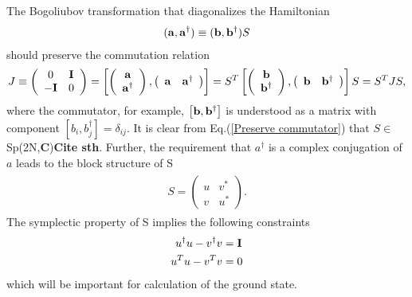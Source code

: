 The Bogoliubov transformation that diagonalizes the Hamiltonian
\begin{eqnarray}\begin{aligned}
\label{Def. of a}
({\bf a} , {\bf a}^\dagger)\equiv({\bf b} , {\bf b}^\dagger)S
\end{aligned}\end{eqnarray}
should preserve the commutation relation
\begin{eqnarray}\begin{aligned}
\label{Preserve commutator}
J\equiv\left(\begin{array}{ccc}
0 & {\bf I}\\
-{\bf I} & 0
\end{array}\right)
=\left[
\left(\begin{array}{ccc}
{\bf a} \\
{\bf a}^\dagger
\end{array}\right),
\left(\begin{array}{ccc}
{\bf a} & {\bf a}^\dagger
\end{array}\right)\right]
=S^T\left[
\left(\begin{array}{ccc}
{\bf b} \\
{\bf b}^\dagger
\end{array}\right),
\left(\begin{array}{ccc}
{\bf b} & {\bf b}^\dagger
\end{array}\right)\right]S
=S^T JS,
\end{aligned}\end{eqnarray}
where the commutator, for example, $\left[{\bf b},{\bf b}^\dagger\right]$ is understood as a matrix with component $\left[b_i,b_j^\dagger\right]=\delta_{ij}$. It is clear from Eq.(\ref{Preserve commutator}) that $S\in$Sp(2N,{\bf C}){\bf\color{red}Cite sth}. Further, the requirement that $a^\dagger$ is a complex conjugation of $a$ leads to the block structure of S
\begin{eqnarray}\begin{aligned}
\label{Block of S}
S=\left(\begin{array}{ccc}
u & v^*\\
v & u^*
\end{array}\right).
\end{aligned}\end{eqnarray}
The symplectic property of S implies the following constraints 
\begin{eqnarray}
u^\dagger u-v^\dagger v&={\bf I}\label{Constraint 1}\\
u^T u-v^T v&=0\label{Constraint 2}
\end{eqnarray}
which will be important for calculation of the ground state. 

